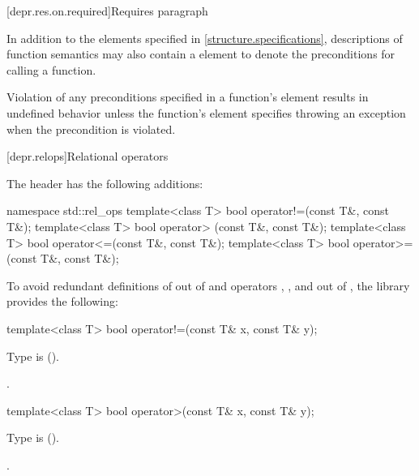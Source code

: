 [depr.res.on.required]{Requires paragraph}

\pnum
In addition to the elements specified in \ref{structure.specifications},
descriptions of function semantics may also contain a \requires element
to denote the preconditions for calling a function.

\pnum
{}%
Violation of any preconditions specified in a function's \requires element
results in undefined behavior
unless the function's \throws element
specifies throwing an exception when the precondition is violated.

%
[depr.relops]{Relational operators}

\pnum
The header  has the following additions:

\begin{codeblock}
namespace std::rel_ops {
  template<class T> bool operator!=(const T&, const T&);
  template<class T> bool operator> (const T&, const T&);
  template<class T> bool operator<=(const T&, const T&);
  template<class T> bool operator>=(const T&, const T&);
}
\end{codeblock}

\pnum
To avoid redundant definitions of  out of 
and operators \tcode{>}, \tcode{<=}, and \tcode{>=} out of ,
the library provides the following:

%
\begin{itemdecl}
template<class T> bool operator!=(const T& x, const T& y);
\end{itemdecl}

\begin{itemdescr}
\pnum
\requires
Type  is  ().

\pnum
\returns
{}.
\end{itemdescr}

%
\begin{itemdecl}
template<class T> bool operator>(const T& x, const T& y);
\end{itemdecl}

\begin{itemdescr}
\pnum
\requires
Type  is  ().

\pnum
\returns
{}.
\end{itemdescr}

